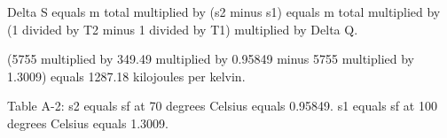 Delta S equals m total multiplied by (s2 minus s1) equals m total multiplied by (1 divided by T2 minus 1 divided by T1) multiplied by Delta Q.  

(5755 multiplied by 349.49 multiplied by 0.95849 minus 5755 multiplied by 1.3009) equals 1287.18 kilojoules per kelvin.  

Table A-2:  
s2 equals sf at 70 degrees Celsius equals 0.95849.  
s1 equals sf at 100 degrees Celsius equals 1.3009.